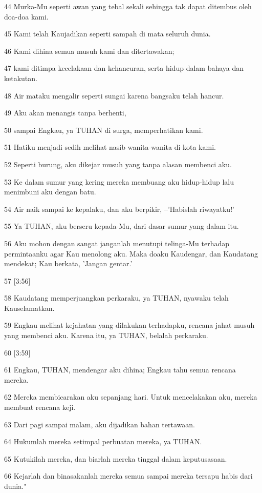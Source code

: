 \par 44 Murka-Mu seperti awan yang tebal sekali sehingga tak dapat ditembus oleh doa-doa kami.
\par 45 Kami telah Kaujadikan seperti sampah di mata seluruh dunia.
\par 46 Kami dihina semua musuh kami dan ditertawakan;
\par 47 kami ditimpa kecelakaan dan kehancuran, serta hidup dalam bahaya dan ketakutan.
\par 48 Air mataku mengalir seperti sungai karena bangsaku telah hancur.
\par 49 Aku akan menangis tanpa berhenti,
\par 50 sampai Engkau, ya TUHAN di surga, memperhatikan kami.
\par 51 Hatiku menjadi sedih melihat nasib wanita-wanita di kota kami.
\par 52 Seperti burung, aku dikejar musuh yang tanpa alasan membenci aku.
\par 53 Ke dalam sumur yang kering mereka membuang aku hidup-hidup lalu menimbuni aku dengan batu.
\par 54 Air naik sampai ke kepalaku, dan aku berpikir, --'Habislah riwayatku!'
\par 55 Ya TUHAN, aku berseru kepada-Mu, dari dasar sumur yang dalam itu.
\par 56 Aku mohon dengan sangat janganlah menutupi telinga-Mu terhadap permintaanku agar Kau menolong aku. Maka doaku Kaudengar, dan Kaudatang mendekat; Kau berkata, 'Jangan gentar.'
\par 57 [3:56]
\par 58 Kaudatang memperjuangkan perkaraku, ya TUHAN, nyawaku telah Kauselamatkan.
\par 59 Engkau melihat kejahatan yang dilakukan terhadapku, rencana jahat musuh yang membenci aku. Karena itu, ya TUHAN, belalah perkaraku.
\par 60 [3:59]
\par 61 Engkau, TUHAN, mendengar aku dihina; Engkau tahu semua rencana mereka.
\par 62 Mereka membicarakan aku sepanjang hari. Untuk mencelakakan aku, mereka membuat rencana keji.
\par 63 Dari pagi sampai malam, aku dijadikan bahan tertawaan.
\par 64 Hukumlah mereka setimpal perbuatan mereka, ya TUHAN.
\par 65 Kutukilah mereka, dan biarlah mereka tinggal dalam keputusasaan.
\par 66 Kejarlah dan binasakanlah mereka semua sampai mereka tersapu habis dari dunia."

